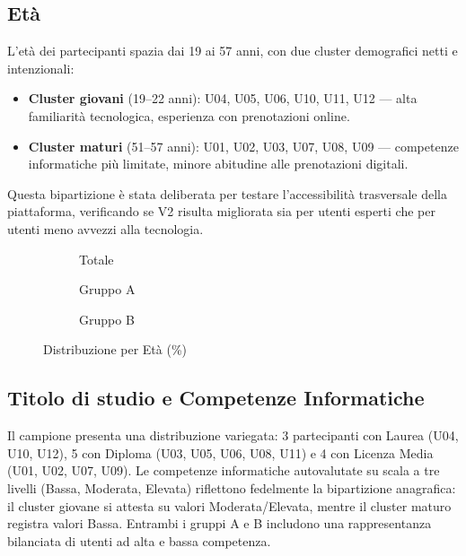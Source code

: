 \subsection{Età}
L'età dei partecipanti spazia dai 19 ai 57 anni, con due cluster demografici netti e intenzionali:
\begin{itemize}
    \item \textbf{Cluster giovani} (19--22 anni): U04, U05, U06, U10, U11, U12 — alta familiarità tecnologica, esperienza con prenotazioni online.
    \item \textbf{Cluster maturi} (51--57 anni): U01, U02, U03, U07, U08, U09 — competenze informatiche più limitate, minore abitudine alle prenotazioni digitali.
\end{itemize}
Questa bipartizione è stata deliberata per testare l'accessibilità trasversale della piattaforma, verificando se V2 risulta migliorata sia per utenti esperti che per utenti meno avvezzi alla tecnologia.

\vspace{0.5em}
\begin{figure}[H]
    \centering
    \begin{subfigure}{0.33\textwidth}
        \centering
        \caption{Totale}
    \end{subfigure}%
    \hfill
    \begin{subfigure}{0.33\textwidth}
        \centering
        \caption{Gruppo A}
    \end{subfigure}%
    \hfill
    \begin{subfigure}{0.33\textwidth}
        \centering
        \caption{Gruppo B}
    \end{subfigure}
    \caption{Distribuzione per Età (\%)}
\end{figure}

\subsection{Titolo di studio e Competenze Informatiche}
Il campione presenta una distribuzione variegata: 3 partecipanti con Laurea (U04, U10, U12), 5 con Diploma (U03, U05, U06, U08, U11) e 4 con Licenza Media (U01, U02, U07, U09). Le competenze informatiche autovalutate su scala a tre livelli (Bassa, Moderata, Elevata) riflettono fedelmente la bipartizione anagrafica: il cluster giovane si attesta su valori Moderata/Elevata, mentre il cluster maturo registra valori Bassa. Entrambi i gruppi A e B includono una rappresentanza bilanciata di utenti ad alta e bassa competenza.

